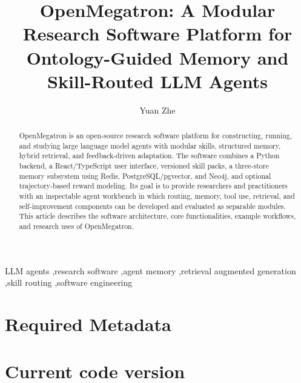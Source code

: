 \documentclass[preprint,12pt,a4paper]{elsarticle}
\begin{document}
\renewcommand{\labelenumii}{\arabic{enumi}.\arabic{enumii}}

\begin{frontmatter}

\title{OpenMegatron: A Modular Research Software Platform for Ontology-Guided Memory and Skill-Routed LLM Agents}

\author[addr1]{Yuan Zhe}
\address[addr1]{Independent Researcher, China}

\begin{abstract}
OpenMegatron is an open-source research software platform for constructing, running, and studying large language model agents with modular skills, structured memory, hybrid retrieval, and feedback-driven adaptation. The software combines a Python backend, a React/TypeScript user interface, versioned skill packs, a three-store memory subsystem using Redis, PostgreSQL/pgvector, and Neo4j, and optional trajectory-based reward modeling. Its goal is to provide researchers and practitioners with an inspectable agent workbench in which routing, memory, tool use, retrieval, and self-improvement components can be developed and evaluated as separable modules. This article describes the software architecture, core functionalities, example workflows, and research uses of OpenMegatron.
\end{abstract}

\begin{keyword}
LLM agents \sep research software \sep agent memory \sep retrieval augmented generation \sep skill routing \sep software engineering
\end{keyword}

\end{frontmatter}

\section*{Required Metadata}

\section*{Current code version}
\end{document}
